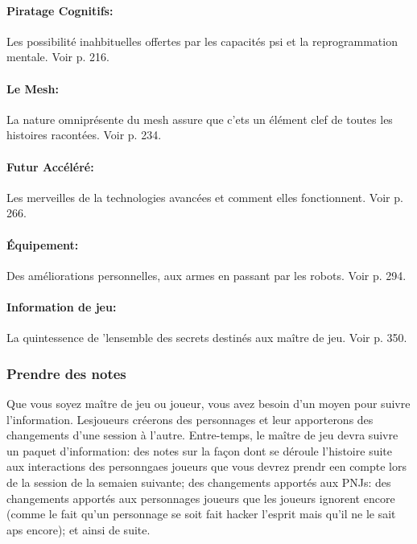 \paragraph{Piratage Cognitifs:} Les possibilité inahbituelles offertes par les capacités psi et la reprogrammation mentale. Voir p. 216. 

\paragraph{Le Mesh:} La nature omniprésente du mesh assure que c'ets un élément clef de toutes les histoires racontées. Voir p. 234. 

\paragraph{Futur Accéléré:} Les merveilles de la technologies avancées et comment elles fonctionnent. Voir p. 266. 

\paragraph{Équipement:} Des améliorations personnelles, aux armes en passant par les robots. Voir p. 294. 

\paragraph{Information de jeu:} La quintessence de 'lensemble des secrets destinés aux maître de jeu. Voir p. 350. 



\subsubsection{Prendre des notes} \label{sec:taking-notes} 

Que vous soyez maître de jeu ou joueur, vous avez besoin d'un moyen pour suivre l'information. Lesjoueurs créerons des personnages et leur apporterons des changements d'une session à l'autre. Entre-temps, le maître de jeu devra suivre un paquet d'information: des notes sur la façon dont se déroule l'histoire suite aux interactions des personngaes joueurs que vous devrez prendr een compte lors de la session de la semaien suivante; des changements apportés aux PNJs: des changements apportés aux personnages joueurs que les joueurs ignorent encore (comme le fait qu'un personnage se soit fait hacker l'esprit mais qu'il ne le sait aps encore); et ainsi de suite. 

